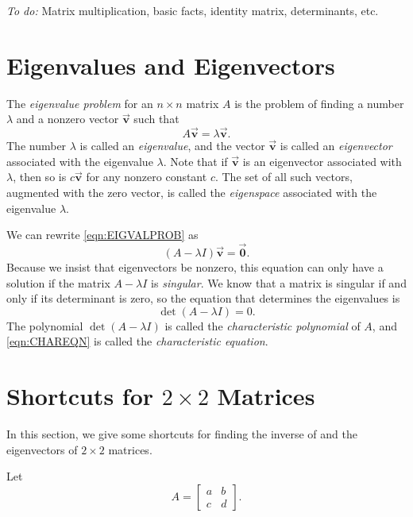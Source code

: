 \documentclass[reqno]{immbook}
\newcommand{\BV}{\vec{\textbf{v}}}
\newcommand{\BZero}{\vec{\textbf{0}}}  %
\numberwithin{equation}{chapter}
\numberwithin{question}{section}
\numberwithin{theorem}{chapter}
\numberwithin{figure}{chapter}
\theoremstyle{definition}
\begin{document}
\medskip
\noindent
\emph{To do:} Matrix multiplication, basic facts, identity matrix,
determinants, etc.
%
\section{Eigenvalues and Eigenvectors}
%
The \emph{eigenvalue problem}
for an $n \times n$ matrix $A$
is the problem of finding a number $\lambda$ and a nonzero vector $\BV$
such that
\begin{equation}
    A\BV = \lambda \BV.
    \label{eqn:EIGVALPROB}
\end{equation}
The number $\lambda$ is called an \emph{eigenvalue}, 
and the vector $\BV$ is called an \emph{eigenvector}
associated with the eigenvalue $\lambda$.
Note that if $\BV$ is an eigenvector associated with
$\lambda$, then so is $c\BV$ for any nonzero constant
$c$.
The set of all such vectors, augmented with the zero
vector, is called the \emph{eigenspace}
associated with the eigenvalue $\lambda$.

We can rewrite \eqref{eqn:EIGVALPROB} as
\begin{equation}
   \left(A - \lambda I\right) \BV = \BZero.
\end{equation}
Because we insist that eigenvectors be nonzero,
this equation can only have a solution if
the matrix $A-\lambda I$ is \emph{singular}.
We know that a matrix is singular if and only if
its determinant is zero, so the equation that determines
the eigenvalues is
\begin{equation}
   \det\left(A-\lambda I\right) = 0.
   \label{eqn:CHAREQN}
\end{equation}
The polynomial $\det\left(A-\lambda I\right)$ is called
the \emph{characteristic polynomial}
of $A$, and
\eqref{eqn:CHAREQN} is 
called the \emph{characteristic equation}.
\section{Shortcuts for $2\times 2$ Matrices}
In this section, we give
some shortcuts for finding the inverse of and the eigenvectors of $2\times 2$ matrices.

Let
\[
   A = \begin{bmatrix}
              a & b \\ c & d
       \end{bmatrix}.
\]
\end{document}
